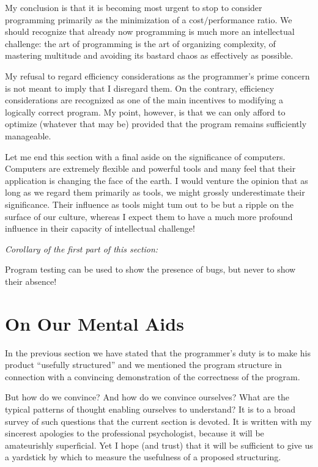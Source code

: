 My conclusion is that it is becoming most urgent to stop to consider programming primarily as the minimization of a cost$/$performance ratio. We
should recognize that already now programming is much more an intellectual challenge: the art of programming is the art of organizing complexity, of mastering multitude and avoiding its bastard chaos as effectively as possible.

My refusal to regard efficiency considerations as the programmer's prime concern is not meant to imply that I disregard them. On the contrary,
efficiency considerations are recognized as one of the main incentives to modifying a logically correct program. My point, however, is that we can
only afford to optimize (whatever that may be) provided that the program remains sufficiently manageable.

Let me end this section with a final aside on the significance of computers. Computers are extremely flexible and powerful tools and many feel that their application is changing the face of the earth. I would venture the opinion that as long as we regard them primarily as tools, we might grossly underestimate their significance. Their influence as tools might tum out to be but a ripple on the surface of our culture, whereas I expect them to have a much more profound influence in their capacity of intellectual challenge!
\smallskip

\noindent
\textit{Corollary of the first part of this section:}
\nopagebreak

Program testing can be used to show the presence of bugs, but never to show their absence!

\section[On our mental aids]{On Our Mental Aids}
\label{sec:out-mental-aids}

In the previous section we have stated that the programmer's duty is to make his product ``usefully structured'' and we mentioned the program structure in connection with a convincing demonstration of the correctness of the program.

But how do we convince? And how do we convince ourselves? What are the typical patterns of thought enabling ourselves to understand? It is to a broad survey of such questions that the current section is devoted. It is written with my sincerest apologies to the professional psychologist, because it will be amateurishly superficial. Yet I hope (and trust) that it will be sufficient to give us a yardstick by which to measure the usefulness of a proposed structuring.

